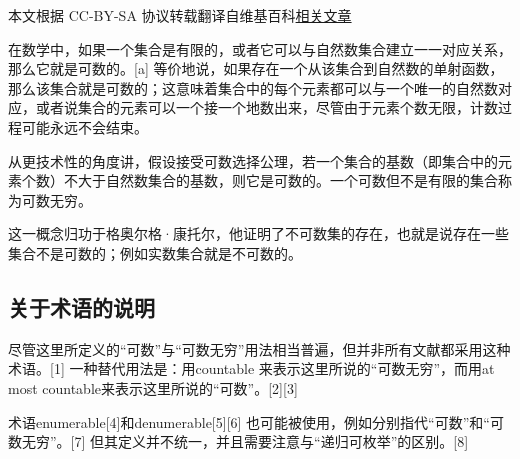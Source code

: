 
本文根据 CC-BY-SA 协议转载翻译自维基百科\href{https://en.wikipedia.org/wiki/Countable_set}{相关文章}

在数学中，如果一个集合是有限的，或者它可以与自然数集合建立一一对应关系，那么它就是可数的。[a] 等价地说，如果存在一个从该集合到自然数的单射函数，那么该集合就是可数的；这意味着集合中的每个元素都可以与一个唯一的自然数对应，或者说集合的元素可以一个接一个地数出来，尽管由于元素个数无限，计数过程可能永远不会结束。

从更技术性的角度讲，假设接受可数选择公理，若一个集合的基数（即集合中的元素个数）不大于自然数集合的基数，则它是可数的。一个可数但不是有限的集合称为可数无穷。

这一概念归功于格奥尔格·康托尔，他证明了不可数集的存在，也就是说存在一些集合不是可数的；例如实数集合就是不可数的。
\subsection{关于术语的说明}
尽管这里所定义的“可数”与“可数无穷”用法相当普遍，但并非所有文献都采用这种术语。[1] 一种替代用法是：用countable 来表示这里所说的“可数无穷”，而用at most countable来表示这里所说的“可数”。[2][3]

术语enumerable[4]和denumerable[5][6] 也可能被使用，例如分别指代“可数”和“可数无穷”。[7] 但其定义并不统一，并且需要注意与“递归可枚举”的区别。[8]


